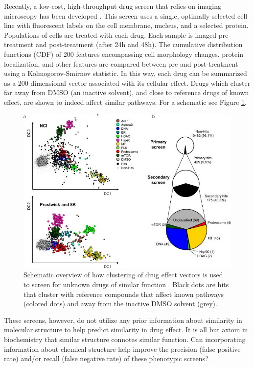 \documentclass{article}
\begin{document}
Recently, a low-cost, high-throughput drug screen that relies on imaging microscopy has been developed \cite{Kang2016}. This screen uses a single, optimally selected cell line with fluorescent labels on the cell membrane, nucleus, and a selected protein. Populations of cells are treated with each drug. Each sample is imaged pre-treatment and post-treatment (after 24h and 48h). The cumulative distribution functions (CDF) of 200 features encompassing cell morphology changes, protein localization, and other features are compared between pre and post-treatment using a Kolmogorov-Smirnov statistic. In this way, each drug can be summarized as a 200 dimensional vector associated with its cellular effect. Drugs which cluster far away from DMSO (an inactive solvent), and close to reference drugs of known effect, are shown to indeed affect similar pathways. For a schematic see Figure \ref{oracl_screen}.

\begin{figure}[h]
\includegraphics[width=\textwidth]{figs/oracl_screen}
\caption{Schematic overview of how clustering of drug effect vectors is used to screen for unknown drugs of similar function \cite{Kang2016}. Black dots are hits that cluster with reference compounds that affect known pathways (colored dots) and away from the inactive DMSO solvent (grey).}
\label{oracl_screen}
\end{figure}

These screens, however, do not utilize any prior information about similarity in molecular structure to help predict similarity in drug effect. It is all but axiom in biochemistry that similar structure connotes similar function. Can incorporating information about chemical structure help improve the precision (false positive rate) and/or recall (false negative rate) of these phenotypic screens?
\end{document}
